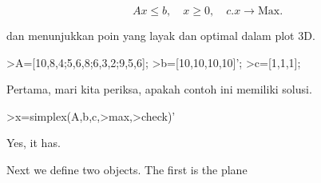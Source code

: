 \documentclass{article}
\begin{document}
\begin{eulernotebook}
\begin{eulercomment}
\begin{eulercomment}
\begin{eulercomment}
\begin{eulercomment}
\begin{eulercomment}
\begin{eulercomment}
\begin{eulercomment}
\begin{eulercomment}
\begin{eulercomment}
\begin{eulercomment}
\begin{eulercomment}
\begin{eulercomment}
\begin{eulercomment}
\begin{eulercomment}
\begin{eulercomment}
\begin{eulercomment}
\begin{eulercomment}
\begin{eulercomment}
\begin{eulercomment}
\begin{eulercomment}
\begin{eulercomment}
\begin{eulercomment}
\begin{eulercomment}
\begin{eulercomment}
\begin{eulercomment}
\begin{eulercomment}
\begin{eulercomment}
\begin{eulercomment}
\begin{eulercomment}
\begin{eulercomment}
\begin{eulercomment}
\end{eulercomment}
\begin{eulerformula}
\[
Ax \le b, \quad x \ge 0, \quad c.x \to \text{Max.}
\]
\end{eulerformula}
\begin{eulercomment}
dan menunjukkan poin yang layak dan optimal dalam plot 3D.
\end{eulercomment}
\begin{eulerprompt}
>A=[10,8,4;5,6,8;6,3,2;9,5,6];
>b=[10,10,10,10]';
>c=[1,1,1];
\end{eulerprompt}
\begin{eulercomment}
Pertama, mari kita periksa, apakah contoh ini memiliki solusi.
\end{eulercomment}
\begin{eulerprompt}
>x=simplex(A,b,c,>max,>check)'
\end{eulerprompt}
\begin{euleroutput}
  [0,  1,  0.5]
\end{euleroutput}
\begin{eulercomment}
Yes, it has.

Next we define two objects. The first is the plane


\end{eulercomment}
\end{eulercomment}
\end{eulercomment}
\end{eulercomment}
\end{eulercomment}
\end{eulercomment}
\end{eulercomment}
\end{eulercomment}
\end{eulercomment}
\end{eulercomment}
\end{eulercomment}
\end{eulercomment}
\end{eulercomment}
\end{eulercomment}
\end{eulercomment}
\end{eulercomment}
\end{eulercomment}
\end{eulercomment}
\end{eulercomment}
\end{eulercomment}
\end{eulercomment}
\end{eulercomment}
\end{eulercomment}
\end{eulercomment}
\end{eulercomment}
\end{eulercomment}
\end{eulercomment}
\end{eulercomment}
\end{eulercomment}
\end{eulercomment}
\end{eulercomment}
\end{eulernotebook}
\end{document}
